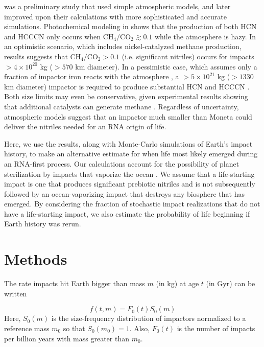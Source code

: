 \documentclass{aastex631}
\begin{document}
\citet{Zahnle_2020} was a preliminary study that used simple atmospheric models, and later \citet{Wogan_2023} improved upon their calculations with more sophisticated and accurate simulations. Photochemical modeling in \citet{Wogan_2023} shows that the production of both HCN and HCCCN only occurs when $\mathrm{CH_4} / \mathrm{CO_2} \gtrsim 0.1$ while the atmosphere is hazy. In an optimistic scenario, which includes nickel-catalyzed methane production, results suggests that $\mathrm{CH_4} / \mathrm{CO_2} > 0.1$ (i.e. significant nitriles) occurs for impacts $> 4 \times 10^{20}$ kg ($> 570$ km diameter). In a pessimistic case, which assumes only a fraction of impactor iron reacts with the atmosphere \citep{Citron_2022}, a $> 5 \times 10^{21}$ kg ($> 1330$ km diameter) impactor is required to produce substantial HCN and HCCCN \citep{Wogan_2023}. Both size limits may even be conservative, given experimental results showing that additional catalysts can generate methane \citep{Hill_2003,Nuth_2016,Nuth_2020}. Regardless of uncertainty, atmospheric models suggest that an impactor much smaller than Moneta could deliver the nitriles needed for an RNA origin of life.

Here, we use the \citet{Wogan_2023} results, along with Monte-Carlo simulations of Earth's impact history, to make an alternative estimate for when life most likely emerged during an RNA-first process. Our calculations account for the possibility of planet sterilization by impacts that vaporize the ocean \citep{Sleep_1989,Maher_1988}. We assume that a life-starting impact is one that produces significant prebiotic nitriles and is not subsequently followed by an ocean-vaporizing impact that destroys any biosphere that has emerged. By considering the fraction of stochastic impact realizations that do not have a life-starting impact, we also estimate the probability of life beginning if Earth history was rerun.

\section{Methods} \label{sec:methods}
The rate impacts hit Earth bigger than mass $m$ (in kg) at age $t$ (in Gyr) can be written

\begin{equation}
  f(t,m) = F_0(t) S_0(m)
\end{equation}
Here, $S_0(m)$ is the size-frequency distribution of impactors normalized to a reference mass $m_0$ so that $S_0(m_0) = 1$. Also, $F_0(t)$ is the number of impacts per billion years with mass greater than $m_0$.
\end{document}
